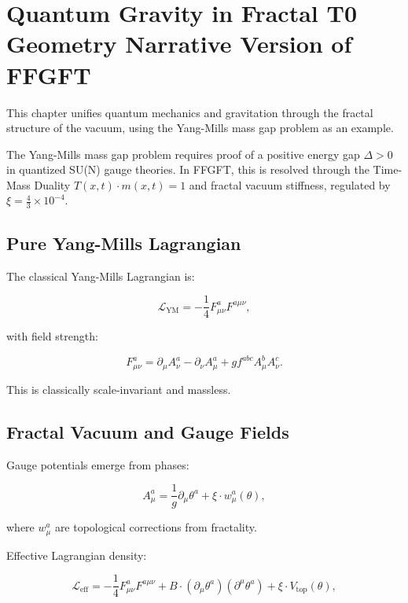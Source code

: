 \chapter{Quantum Gravity in Fractal T0 Geometry  Narrative Version of FFGFT}


	
	This chapter unifies quantum mechanics and gravitation through the fractal structure of the vacuum, using the Yang-Mills mass gap problem as an example.
	
	
	The Yang-Mills mass gap problem requires proof of a positive energy gap $\Delta > 0$ in quantized SU(N) gauge theories. In FFGFT, this is resolved through the Time-Mass Duality $T(x,t) \cdot m(x,t) = 1$ and fractal vacuum stiffness, regulated by $\xi = \frac{4}{3} \times 10^{-4}$.
	
	
	
	\section*{Pure Yang-Mills Lagrangian}
	
	The classical Yang-Mills Lagrangian is:
	
	\begin{equation}
		\mathcal{L}_{\text{YM}} = -\frac{1}{4} F_{\mu\nu}^a F^{a\mu\nu},
	\end{equation}
	
	with field strength:
	
	\begin{equation}
		F_{\mu\nu}^a = \partial_\mu A_\nu^a - \partial_\nu A_\mu^a + g f^{abc} A_\mu^b A_\nu^c.
	\end{equation}
	
	This is classically scale-invariant and massless.
	
	\section*{Fractal Vacuum and Gauge Fields}
	
	Gauge potentials emerge from phases:
	
	\begin{equation}
		A_\mu^a = \frac{1}{g} \partial_\mu \theta^a + \xi \cdot w_\mu^a(\theta),
	\end{equation}
	
	where $w_\mu^a$ are topological corrections from fractality.
	
	Effective Lagrangian density:
	
	\begin{equation}
		\mathcal{L}_{\text{eff}} = -\frac{1}{4} F_{\mu\nu}^a F^{a\mu\nu} + B \cdot (\partial_\mu \theta^a)(\partial^\mu \theta^a) + \xi \cdot V_{\text{top}}(\theta),
	\end{equation}
	
